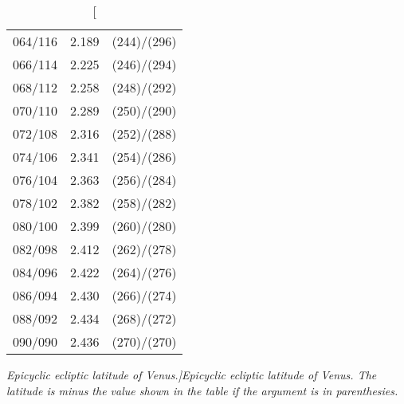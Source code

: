 \begin{table}
{\begin{tabular}{crc}
064/116 &  2.189 & (244)/(296)\\
066/114 &  2.225 & (246)/(294)\\
068/112 &  2.258 & (248)/(292)\\
070/110 &  2.289 & (250)/(290)\\
072/108 &  2.316 & (252)/(288)\\
074/106 &  2.341 & (254)/(286)\\
076/104 &  2.363 & (256)/(284)\\
078/102 &  2.382 & (258)/(282)\\
080/100 &  2.399 & (260)/(280)\\
082/098 &  2.412 & (262)/(278)\\
084/096 &  2.422 & (264)/(276)\\
086/094 &  2.430 & (266)/(274)\\
088/092 &  2.434 & (268)/(272)\\
090/090 &  2.436 & (270)/(270)\\
\end{tabular}}
\caption[\em Epicyclic ecliptic latitude of Venus.]{\em Epicyclic ecliptic latitude of Venus.  The latitude is minus the value shown
in the table if the argument is
in parenthesies. }\label{tlat1v}
\end{table}

